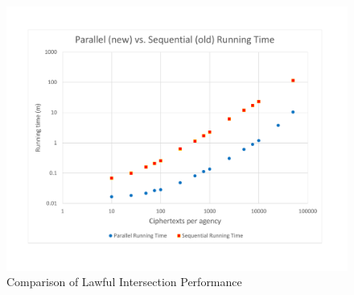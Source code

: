\begin{figure}
\centering
\includegraphics[width=0.99\columnwidth]{intersectionchart.pdf}
\caption{Comparison of Lawful Intersection Performance}
\label{fig:isectgraph}
\end{figure}

